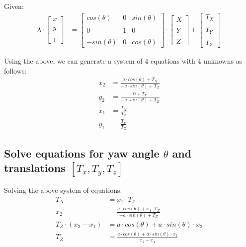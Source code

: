 \documentclass[12pt, oneside]{article}
\begin{document}
Given:
\begin{align*}
    \lambda \cdot
    \begin{bmatrix} x \\ \\ y \\ \\ 1 \end{bmatrix}  
    &= 
    \begin{bmatrix} cos(\theta) & 0 & sin(\theta) \\ \\ 
                    0 & 1 & 0\\ \\ 
                    -sin(\theta) & 0 & cos(\theta)
    \end{bmatrix}  \cdot 
    \begin{bmatrix} X \\ \\ Y \\ \\ Z \end{bmatrix}  +
    \begin{bmatrix} T_X \\ \\ T_Y \\ \\ T_Z \end{bmatrix}  
\end{align*}

Using the above, we can generate a system of 4 equations with 4 unknowns as 
follows:
\begin{align*}
    x_2 &= \frac{a \cdot cos(\theta) + T_X}{-a \cdot sin(\theta) + T_Z} \\
    y_2 &= \frac{0 + T_Y}{-a \cdot sin(\theta) + T_Z} \\
    x_1 &= \frac{T_X}{T_Z}  \\
    y_1 &= \frac{T_Y}{T_Z} 
\end{align*}

\subsection{Solve equations for yaw angle $\theta$ and translations 
$[T_x, T_y, T_z]$}

Solving the above system of equations:
\begin{align*}
T_X &= x_1 \cdot {T_Z}  \\
x_2 &= \frac{a \cdot cos(\theta) + x_1 \cdot {T_Z}}{-a \cdot sin(\theta) + T_Z} \\
T_Z \cdot (x_2 - x_1) &= a \cdot cos(\theta) + a \cdot sin(\theta) \cdot x_2 \\
T_Z &= \frac{a \cdot cos(\theta) + a \cdot sin(\theta) \cdot x_2}{x_2 - x_1} \\
\end{align*}
\end{document}
